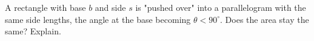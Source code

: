 A rectangle with base $b$ and side $s$ is "pushed over" into a parallelogram with the same side lengths, the angle at the base becoming $\theta<90^\circ$. Does the area stay the same? Explain.
